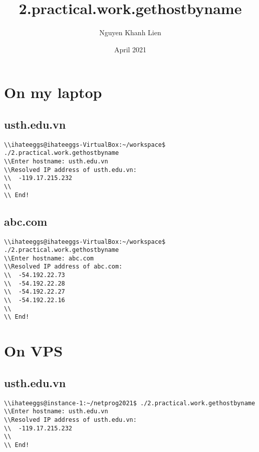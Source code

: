\documentclass{article}
\title{2.practical.work.gethostbyname}
\author{Nguyen Khanh Lien}
\date{April 2021}
\begin{document}
\maketitle

\section{On my laptop}
\subsection{usth.edu.vn}
\begin{lstlisting}
\\ihateeggs@ihateeggs-VirtualBox:~/workspace$ ./2.practical.work.gethostbyname
\\Enter hostname: usth.edu.vn
\\Resolved IP address of usth.edu.vn:
\\  -119.17.215.232
\\ 
\\ End!
\end{lstlisting}

\subsection{abc.com}
\begin{lstlisting}
\\ihateeggs@ihateeggs-VirtualBox:~/workspace$ ./2.practical.work.gethostbyname 
\\Enter hostname: abc.com
\\Resolved IP address of abc.com:
\\	-54.192.22.73
\\ 	-54.192.22.28
\\ 	-54.192.22.27
\\ 	-54.192.22.16
\\ 
\\ End!
\end{lstlisting}

\section{On VPS}
\subsection{usth.edu.vn}
\begin{lstlisting}
\\ihateeggs@instance-1:~/netprog2021$ ./2.practical.work.gethostbyname 
\\Enter hostname: usth.edu.vn
\\Resolved IP address of usth.edu.vn:
\\	-119.17.215.232
\\ 
\\ End!
\end{lstlisting}
\end{document}

